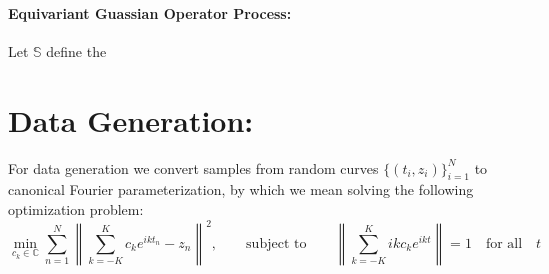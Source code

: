 \documentclass{article}
\newcommand{\expectp}[1]{\mathbb{E}\left[#1\right]}
\newcommand{\circle}{\mathbb{S}}
\begin{document}
    \paragraph{Equivariant Guassian Operator Process:}
    Let $\circle$ define the 
    

    \section{Data Generation:}
    For data generation we convert samples from random curves $\{(t_i, z_i)\}_{i=1}^N$ to canonical Fourier parameterization, by which we mean solving the following optimization problem:
    \[
        \min_{c_k\in \mathbb{C}}\sum_{n=1}^N\left\|\sum_{k=-K}^K c_ke^{ikt_n} - z_n\right\|^2,\qquad \text{subject to}\qquad \left\|\sum_{k=-K}^K ikc_ke^{ikt}\right\|=1\quad \text{for all} \quad t
    \]
\end{document}
